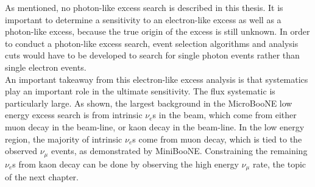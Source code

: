 As mentioned, no photon-like excess search is described in this thesis. It is important to determine a sensitivity to an electron-like excess as well as a photon-like excess, because the true origin of the excess is still unknown. In order to conduct a photon-like excess search, event selection algorithms and analysis cuts would have to be developed to search for single photon events rather than single electron events.\\

An important takeaway from this electron-like excess analysis is that systematics play an important role in the ultimate sensitivity. The flux systematic is particularly large. As shown, the largest background in the MicroBooNE low energy excess search is from intrinsic $\nu_e$s in the beam, which come from either muon decay in the beam-line, or kaon decay in the beam-line. In the low energy region, the majority of intrinsic $\nu_e$s come from muon decay, which is tied to the observed $\nu_\mu$ events, as demonstrated by MiniBooNE. Constraining the remaining $\nu_e$s from kaon decay can be done by observing the high energy $\nu_\mu$ rate, the topic of the next chapter.

